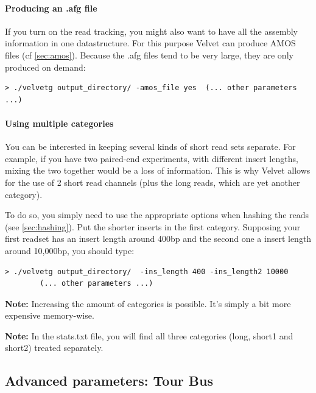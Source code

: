 \documentclass{article}
\begin{document}
	\paragraph{Producing an .afg file}
	
If you turn on the read tracking, you might also want to have all the  assembly information in one datastructure. For this purpose Velvet can produce AMOS files (cf \ref{sec:amos}). Because the .afg files tend to be very large, they are only produced on demand:

\begin{verbatim}
> ./velvetg output_directory/ -amos_file yes  (... other parameters ...)
\end{verbatim}

	\paragraph{Using multiple categories}

You can be interested in keeping several kinds of short read sets separate.
For example, if you have two paired-end experiments, with different insert
lengths, mixing the two together would be a loss of information. This is why
Velvet allows for the use of 2 short read channels (plus the long reads, which
are yet another category).

To do so, you simply need to use the appropriate options when hashing the
reads (see \ref{sec:hashing}). Put the shorter inserts in the first category. Supposing your first  readset has an insert length around 400bp and the second one a insert length around 10,000bp, you should type:

\begin{verbatim}
> ./velvetg output_directory/  -ins_length 400 -ins_length2 10000  
		(... other parameters ...)
\end{verbatim}

\textbf{Note:} Increasing the amount of categories is possible. It's simply a bit more
expensive memory-wise. 

\textbf{Note:} In the stats.txt file, you will find all three categories (long,
short1 and short2) treated separately.

\subsection{Advanced parameters: Tour Bus}
\end{document}
